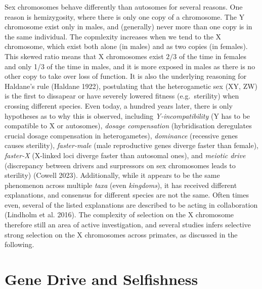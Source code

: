 \documentclass[
  11pt,
  a4paper,
]{scrbook}
\let\oldemph\emph
\renewcommand\emph[1]{\oldemph{\color{gray}#1}}
\begin{document}
Sex chromosomes behave differently than autosomes for several reasons.
One reason is hemizygosity, where there is only one copy of a
chromosome. The Y chromosome exist only in males, and (generally) never
more than one copy is in the same individual. The copmlexity increases
when we tend to the X chromosome, which exist both alone (in males) and
as two copies (in females). This skewed ratio means that X chromosomes
exist \(2/3\) of the time in females and only 1/3 of the time in males,
and it is more exposed in males as there is no other copy to take over
loss of function. It is also the underlying reasoning for Haldane's rule
(Haldane 1922), postulating that the heterogametic sex (XY, ZW) is the
first to dissapear or have severely lowered fitness (e.g.~sterility)
when crossing different species. Even today, a hundred years later,
there is only hypotheses as to why this is observed, including
\emph{Y-incompatibility} (Y has to be compatible to X or autosomes),
\emph{dosage compensation} (hybridisation deregulates crucial dosage
compensation in heterogametes), \emph{dominance} (recessive genes causes
sterility), \emph{faster-male} (male reproductive genes diverge faster
than female), \emph{faster-X} (X-linked loci diverge faster than
autosomal ones), and \emph{meiotic drive} (discrepancy between drivers
and surpressors on sex chromosomes leads to sterility) (Cowell 2023).
Additionally, while it appears to be the same phenomenon across multiple
\emph{taxa} (even \emph{kingdoms}), it has received different
explanations, and consensus for different species are not the same.
Often times even, several of the listed explanations are described to be
acting in collaboration (Lindholm et al. 2016). The complexity of
selection on the X chromosome therefore still an area of active
investigation, and several studies infers selective strong selection on
the X chromosomes across primates, as discussed in the following.

\section{Gene Drive and Selfishness}\label{gene-drive-and-selfishness}
\end{document}
